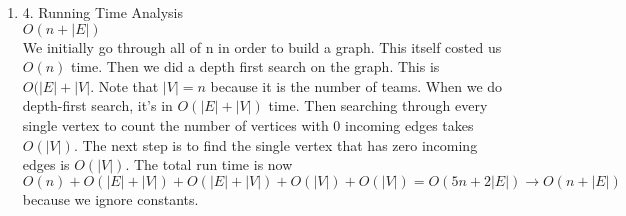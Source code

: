 \documentclass[11pt]{article}
\newenvironment{qparts}{\begin{enumerate}[{(}a{)}]}{\end{enumerate}}
\begin{document}
\begin{qparts}
In the cycle, any of the teams can win depending on where we we start. Therefore any of the values in the cycle can win. We can just put all the teams into a list and stick it into the biggest post-visited value node, as we can return this list at the end. Then we count the number of vertices that has no incoming edgest. This means that the specific vertex holds a winning node because no one can beat it. However if there are more than one, we have no absolute way of deciding who wins because no one can beat either of the teams existing in the node. But if there's only one, we know that there is an absolute winner because that node is where all the possible winner exists because that node does not have any other node of teams who can beat it. 
\item[4.] Running Time Analysis \\
$O(n+|E|)$ \\

We initially go through all of n in order to build a graph. This itself costed us $O(n)$ time. Then we did a depth first search on the graph. This is $O(|E| + |V|$. Note that $|V| = n$ because it is the number of teams. When we do depth-first search, it's in $O(|E|+|V|)$ time. Then searching through every single vertex to count the number of vertices with 0 incoming edges takes $O(|V|)$. The next step is to find the single vertex that has zero incoming edges is $O(|V|)$. The total run time is now $O(n) + O(|E| + |V|) + O(|E| + |V|) + O(|V|) + O(|V|) = O(5n + 2|E|) \rightarrow O(n + |E|)$ because we ignore constants. 
\end{qparts}
\newpage
\end{document}
